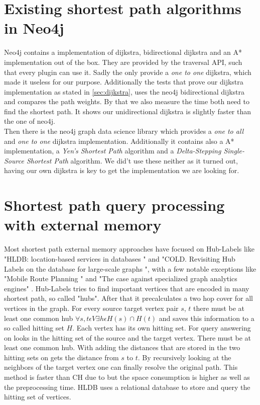 \section{Existing shortest path algorithms in Neo4j}

Neo4j contains a implementation of dijkstra, bidirectional dijkstra and an A* implementation out of the box.
They are provided by the traversal API, such that every plugin can use it.
Sadly the only provide a \textit{one to one} dijkstra, which made it useless for our purpose.
Additionally the tests that prove our dijkstra implementation as stated in \ref{sec:dijkstra}, uses the neo4j bidirectional dijkstra and compares the path weights.
By that we also measure the time both need to find the shortest path.
It shows our unidirectional dijkstra is slightly faster than the one of neo4j.
\\
Then there is the neo4j graph data science library  which provides a \textit{one to all} and \textit{one to one} dijkstra implementation.
Additionally it contains also a A* implementation, a \textit{Yen’s Shortest Path} algorithm and a \textit{Delta-Stepping Single-Source Shortest Path} algorithm.
We did't use these neither as it turned out, having our own dijkstra is key to get the implementation we are looking for.

\section{Shortest path query processing with external memory}

Most shortest path external memory approaches have focused on Hub-Labels like "HLDB: location-based services in databases \cite{Abraham_2012}" and "COLD. Revisiting Hub Labels on the database for large-scale graphs \cite{efentakis2015cold}", with a few notable exceptions like "Mobile Route Planning \cite{Sanders}" and "The case against specialized graph analytics engines" \cite{fan2015case}.
Hub-Labels tries to find important vertices that are encoded in many shortest path, so called "hubs". 
After that it precalculates a two hop cover for all vertices in the graph.
For every source target vertex pair $s$, $t$ there must be at least one common hub $\forall s,t \epsilon V \exists h \epsilon H(s) \cap H(t)$ \cite{Abraham_2011} and saves this information to a so called hitting set $H$. 
Each vertex has its own hitting set. 
For query answering on looks in the hitting set of the source and the target vertex. 
There must be at least one common hub.
With adding the distances that are stored in the two hitting sets on gets the distance from $s$ to $t$.
By recursively looking at the neighbors of the target vertex one can finally resolve the original path. 
This method is faster than CH due to \cite{Abraham_2012} but the space consumption is higher as well as the preprocessing time. 
HLDB \cite{Abraham_2012} uses a relational database to store and query the hitting set of vertices.

